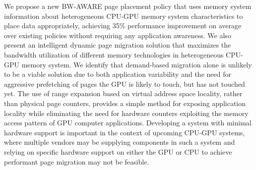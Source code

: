We propose a new BW-AWARE page placement policy that uses memory system
information about heterogeneous CPU-GPU memory system characteristics to place
data appropriately, achieving 35\% performance improvement on average over
existing policies without requiring any application awareness.
%
%
We also present an intelligent dynamic page migration solution that maximizes the
bandwidth utilization of different memory technologies in heterogeneous CPU-GPU
memory system.  We identify that demand-based migration alone is unlikely to be
a viable solution due to both application variability and the need for
aggressive prefetching of pages the GPU is likely to touch, but has not touched
yet.  The use of range expansion based on virtual address space locality, rather
than physical page counters, provides a simple method for exposing application
locality while eliminating the need for hardware counters exploiting the memory
access pattern of GPU computer applications.  Developing a system with minimal
hardware support is important in the context of upcoming CPU-GPU systems, where
multiple vendors may be supplying components in such a system and relying on
specific hardware support on either the GPU or CPU to achieve performant page
migration may not be feasible. 

